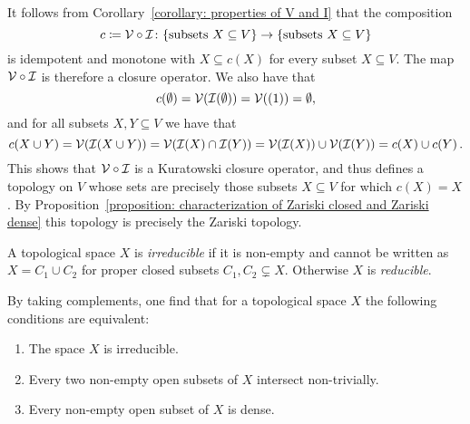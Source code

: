 \begin{remark}
  It follows from Corollary~\ref{corollary: properties of V and I} that the composition
  \[
              c
    \coloneqq  \mathcal{V} \circ \mathcal{I}
    \colon    \{ \text{subsets $X \subseteq V$} \}
    \to       \{ \text{subsets $X \subseteq V$} \}
  \]
  is idempotent and monotone with $X \subseteq c(X)$ for every subset $X \subseteq V$.
  The map $\mathcal{V} \circ \mathcal{I}$ is therefore a closure operator.
  We also have that
  \[
      c(\emptyset)
    = \mathcal{V}(\mathcal{I}(\emptyset))
    = \mathcal{V}((1))
    = \emptyset,
  \]
  and for all subsets $X, Y \subseteq V$ we have that
  \[
      c(X \cup Y)
    = \mathcal{V}(\mathcal{I}(X \cup Y))
    = \mathcal{V}(\mathcal{I}(X) \cap \mathcal{I}(Y))
    = \mathcal{V}(\mathcal{I}(X)) \cup \mathcal{V}(\mathcal{I}(Y))
    = c(X) \cup c(Y) \,.
  \]
  This shows that $\mathcal{V} \circ \mathcal{I}$ is a Kuratowski closure operator, and thus defines a topology on $V$ whose sets are precisely those subsets $X \subseteq V$ for which $c(X) = X$.
  By Proposition~\ref{proposition: characterization of Zariski closed and Zariski dense} this topology is precisely the Zariski topology.
\end{remark}


\begin{definition}
  A topological space $X$ is \emph{irreducible} if it is non-empty and cannot be written as $X = C_1 \cup C_2$ for proper closed subsets $C_1, C_2 \subsetneq X$.
  Otherwise $X$ is \emph{reducible}.
\end{definition}


\begin{remark}
  By taking complements, one find that for a topological space $X$ the following conditions are equivalent:
  \begin{enumerate}
    \item
      The space $X$ is irreducible.
    \item
      Every two non-empty open subsets of $X$ intersect non-trivially.
    \item
      Every non-empty open subset of $X$ is dense.
  \end{enumerate}
\end{remark}


% 
% 


